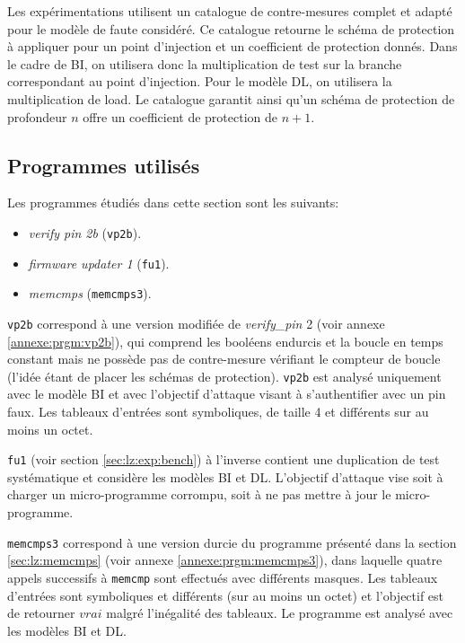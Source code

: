             Les expérimentations utilisent un catalogue de contre-mesures complet et adapté pour le modèle de faute considéré. Ce catalogue retourne le schéma de protection à appliquer pour un point d'injection et un coefficient de protection donnés. 
            Dans le cadre de \gls{BI}, on utilisera donc la multiplication de test sur la branche correspondant au point d'injection.
            Pour le modèle \gls{DL}, on utilisera la multiplication de load.
            Le catalogue garantit ainsi qu'un schéma de protection de profondeur $n$ offre un coefficient de protection de $n + 1$.
        
        \subsection{Programmes utilisés}
        \label{sec:placement-exp-prgm}

            Les programmes étudiés dans cette section sont les suivants:
            \begin{itemize}
                \item \textit{verify pin 2b} (\texttt{vp2b}).
                \item \textit{firmware updater 1} (\texttt{fu1}).
                \item \textit{memcmps} (\texttt{memcmps3}).
            \end{itemize}
    
            \texttt{vp2b} correspond à une version modifiée de \textit{verify\_pin} 2 (voir annexe \ref{annexe:prgm:vp2b}), qui comprend les booléens endurcis et la boucle en temps constant mais ne possède pas de contre-mesure vérifiant le compteur de boucle (l'idée étant de placer les schémas de protection). \texttt{vp2b} est analysé uniquement avec le modèle \gls{BI} et avec l'objectif d'attaque visant à s'authentifier avec un \gls{pin} faux. Les tableaux d'entrées sont symboliques, de taille 4 et différents sur au moins un octet.
    
            \texttt{fu1} (voir section \ref{sec:lz:exp:bench}) à l'inverse contient une duplication de test systématique et considère les modèles \gls{BI} et \gls{DL}. L'objectif d'attaque vise soit à charger un micro-programme corrompu, soit à ne pas mettre à jour le micro-programme.
    
            \texttt{memcmps3} correspond à une version durcie du programme présenté dans la section \ref{sec:lz:memcmps} (voir annexe \ref{annexe:prgm:memcmps3}), dans laquelle quatre appels successifs à \texttt{memcmp} sont effectués avec différents masques. Les tableaux d'entrées sont symboliques et différents (sur au moins un octet) et l'objectif est de retourner $vrai$ malgré l'inégalité des tableaux.
            Le programme est analysé avec les modèles \gls{BI} et \gls{DL}. 
        
